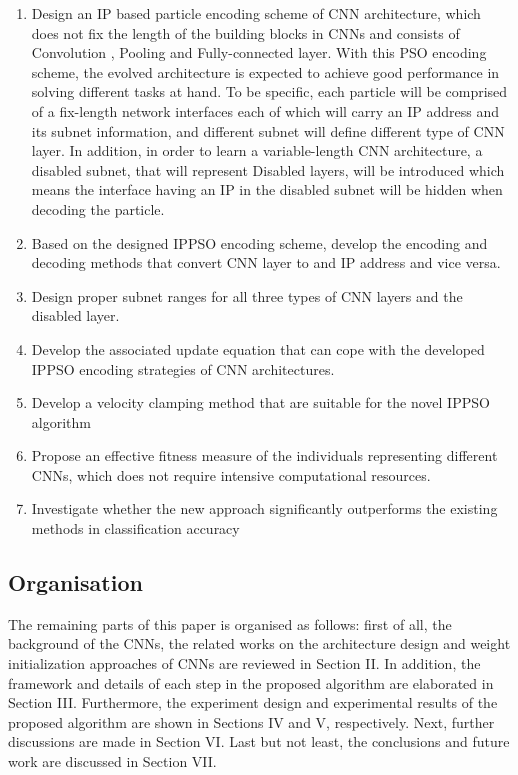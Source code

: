 \documentclass[conference]{IEEEtran}
\begin{document}
\begin{enumerate}
	\item Design an IP based particle encoding scheme of CNN architecture, which does not fix the length of the building blocks in CNNs and consists of Convolution , Pooling and Fully-connected layer. With this PSO encoding scheme, the evolved architecture is expected to achieve good performance in solving different tasks at hand. To be specific, each particle will be comprised of a fix-length network interfaces each of which will carry an IP address and its subnet information, and different subnet will define different type of CNN layer. In addition, in order to learn a variable-length CNN architecture, a disabled subnet, that will represent Disabled layers, will be introduced which means the interface having an IP in the disabled subnet will be hidden when decoding the particle.
	\item Based on the designed IPPSO encoding scheme, develop the encoding and decoding methods that convert CNN layer to and IP address and vice versa. 
	\item Design proper subnet ranges for all three types of CNN layers and the disabled layer.  
	\item Develop the associated update equation that can cope with the developed IPPSO encoding strategies of CNN architectures.
	\item Develop a velocity clamping method that are suitable for the novel IPPSO algorithm
	\item Propose an effective fitness measure of the individuals representing different CNNs, which does not require intensive computational resources.
	\item Investigate whether the new approach significantly outperforms the existing methods in classification accuracy
\end{enumerate} 

\subsection{Organisation}
The remaining parts of this paper is organised as follows: first of all, the background of the CNNs, the related works on the architecture design and weight initialization approaches of CNNs are
reviewed in Section II. In addition, the framework and details of each step in the proposed algorithm are elaborated in Section III. Furthermore, the experiment design and experimental results of the proposed algorithm are shown in Sections IV and V, respectively. Next, further discussions are made in Section VI. Last but not least, the conclusions and future work are discussed in Section VII.
\end{document}
